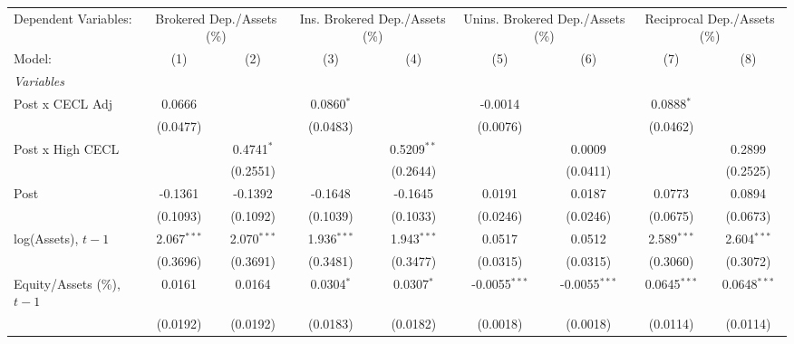 
\begingroup
\centering
\begin{tabular}{lcccccccc}
   \tabularnewline \midrule \midrule
   Dependent Variables: & \multicolumn{2}{c}{Brokered Dep./Assets (\%)} & \multicolumn{2}{c}{Ins. Brokered Dep./Assets (\%)} & \multicolumn{2}{c}{Unins. Brokered Dep./Assets (\%)} & \multicolumn{2}{c}{Reciprocal Dep./Assets (\%)}\\
   Model:                         & (1)           & (2)           & (3)           & (4)           & (5)             & (6)             & (7)            & (8)\\  
   \midrule
   \emph{Variables}\\
   Post x CECL Adj                & 0.0666        &               & 0.0860$^{*}$  &               & -0.0014         &                 & 0.0888$^{*}$   &   \\   
                                  & (0.0477)      &               & (0.0483)      &               & (0.0076)        &                 & (0.0462)       &   \\   
   Post x High CECL               &               & 0.4741$^{*}$  &               & 0.5209$^{**}$ &                 & 0.0009          &                & 0.2899\\   
                                  &               & (0.2551)      &               & (0.2644)      &                 & (0.0411)        &                & (0.2525)\\   
   Post                           & -0.1361       & -0.1392       & -0.1648       & -0.1645       & 0.0191          & 0.0187          & 0.0773         & 0.0894\\   
                                  & (0.1093)      & (0.1092)      & (0.1039)      & (0.1033)      & (0.0246)        & (0.0246)        & (0.0675)       & (0.0673)\\   
   log(Assets), $t{-}1$           & 2.067$^{***}$ & 2.070$^{***}$ & 1.936$^{***}$ & 1.943$^{***}$ & 0.0517          & 0.0512          & 2.589$^{***}$  & 2.604$^{***}$\\   
                                  & (0.3696)      & (0.3691)      & (0.3481)      & (0.3477)      & (0.0315)        & (0.0315)        & (0.3060)       & (0.3072)\\   
   Equity/Assets (\%), $t{-}1$    & 0.0161        & 0.0164        & 0.0304$^{*}$  & 0.0307$^{*}$  & -0.0055$^{***}$ & -0.0055$^{***}$ & 0.0645$^{***}$ & 0.0648$^{***}$\\   
                                  & (0.0192)      & (0.0192)      & (0.0183)      & (0.0182)      & (0.0018)        & (0.0018)        & (0.0114)       & (0.0114)\\   

\end{tabular}
